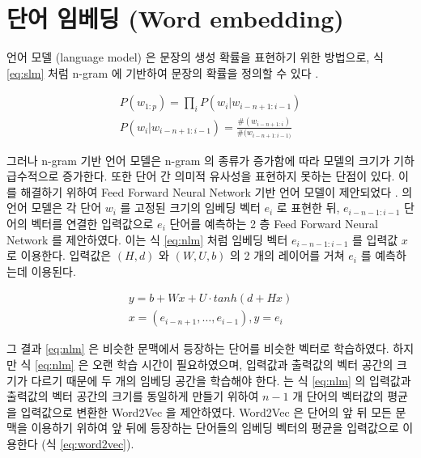 \documentclass[oneside, ko,phd]{snuthesis_utf8_kor}
\begin{document}
\section{단어 임베딩 (Word embedding)}

언어 모델 (language model) 은 문장의 생성 확률을 표현하기 위한 방법으로, 식 \ref{eq:slm} 처럼 n-gram 에 기반하여 문장의 확률을 정의할 수 있다 \cite{jurafsky2014speech}.

\begin{equation}
  \label{eq:slm}
  \begin{aligned}
  P(w_{1:p}) = \prod_i P(w_i \vert w_{i-n+1:i-1}) \\
  P(w_i \vert w_{i-n+1:i-1}) = \frac{\#(w_{i-n+1:i})}{\#(w_{i-n+1:i-1)}}
  \end{aligned}
\end{equation}

그러나 n-gram 기반 언어 모델은 n-gram 의 종류가 증가함에 따라 모델의 크기가 기하급수적으로 증가한다.
또한 단어 간 의미적 유사성을 표현하지 못하는 단점이 있다.
이를 해결하기 위하여 Feed Forward Neural Network 기반 언어 모델이 제안되었다 \cite{bengio2003neural}.
\cite{bengio2003neural} 의 언어 모델은 각 단어 $w_i$ 를 고정된 크기의 임베딩 벡터 $e_i$ 로 표현한 뒤, $e_{i-n-1:i-1}$ 단어의 벡터를 연결한 입력값으로 $e_i$ 단어를 예측하는 2 층 Feed Forward Neural Network 를 제안하였다.
이는 식 \ref{eq:nlm} 처럼 임베딩 벡터 $e_{i-n-1:i-1}$ 를 입력값 $x$ 로 이용한다.
입력값은 $(H, d)$ 와 $(W, U, b)$ 의 2 개의 레이어를 거쳐 $e_i$ 를 예측하는데 이용된다.

\begin{equation}
  \label{eq:nlm}
  \begin{aligned}
  y = b + Wx + U \cdot tanh(d + Hx) \\
  x = (e_{i-n+1}, \dots, e_{i-1}), y = e_i
  \end{aligned}
\end{equation}

그 결과 \ref{eq:nlm} 은 비슷한 문맥에서 등장하는 단어를 비슷한 벡터로 학습하였다.
하지만 식 \ref{eq:nlm} 은 오랜 학습 시간이 필요하였으며, 입력값과 출력값의 벡터 공간의 크기가 다르기 때문에 두 개의 임베딩 공간을 학습해야 한다.
\cite{mikolov2013efficient} 는 식 \ref{eq:nlm} 의 입력값과 출력값의 벡터 공간의 크기를 동일하게 만들기 위하여 $n-1$ 개 단어의 벡터값의 평균을 입력값으로 변환한 Word2Vec 을 제안하였다.
Word2Vec 은 단어의 앞 뒤 모든 문맥을 이용하기 위하여 앞 뒤에 등장하는 단어들의 임베딩 벡터의 평균을 입력값으로 이용한다 (식 \ref{eq:word2vec}).
\end{document}
